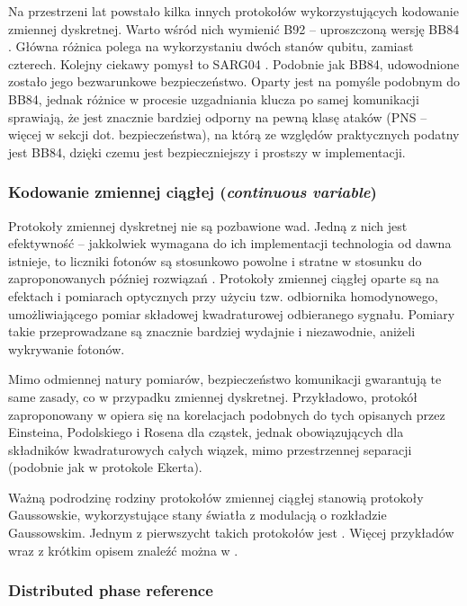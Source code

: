 \documentclass[10pt]{article}
\begin{document}
Na przestrzeni lat powstało kilka innych protokołów wykorzystujących kodowanie zmiennej dyskretnej.
Warto wśród nich wymienić B92 -- uproszczoną wersję BB84 \cite{Bennett92}. Główna różnica polega na
wykorzystaniu dwóch stanów qubitu, zamiast czterech. Kolejny ciekawy pomysł to SARG04 \cite{Scarani04}.
Podobnie jak BB84, udowodnione zostało jego bezwarunkowe bezpieczeństwo. Oparty jest na pomyśle 
podobnym do BB84, jednak różnice w procesie uzgadniania klucza po samej komunikacji sprawiają, że jest
znacznie bardziej odporny na pewną klasę ataków (PNS -- więcej w sekcji dot. bezpieczeństwa), na którą 
ze względów praktycznych podatny jest BB84, dzięki czemu jest bezpieczniejszy i prostszy w implementacji.


\subsubsection*{Kodowanie zmiennej ciągłej (\emph{continuous variable})}

Protokoły zmiennej dyskretnej nie są pozbawione wad. Jedną z nich jest efektywność -- jakkolwiek
wymagana do ich implementacji technologia od dawna istnieje, to liczniki fotonów są stosunkowo
powolne i stratne w stosunku do zaproponowanych później rozwiązań \cite{Reid00,Cerf01}. Protokoły
zmiennej ciągłej oparte są na efektach i pomiarach optycznych przy użyciu tzw. odbiornika homodynowego,
umożliwiającego pomiar składowej kwadraturowej odbieranego sygnału. Pomiary takie przeprowadzane
są znacznie bardziej wydajnie i niezawodnie, aniżeli wykrywanie fotonów.

Mimo odmiennej natury pomiarów, bezpieczeństwo komunikacji gwarantują te same zasady, co w przypadku
zmiennej dyskretnej. Przykładowo, protokół zaproponowany w \cite{Reid00} opiera się na korelacjach 
podobnych do tych opisanych przez Einsteina, Podolskiego i Rosena dla cząstek, jednak obowiązujących 
dla składników kwadraturowych całych wiązek, mimo przestrzennej separacji (podobnie jak w protokole 
Ekerta).

Ważną podrodzinę rodziny protokołów zmiennej ciągłej stanowią protokoły Gaussowskie, wykorzystujące
stany światła z modulacją o rozkładzie Gaussowskim. Jednym z pierwszycht takich protokołów jest 
\cite{Cerf01}. Więcej przykładów wraz z krótkim opisem znaleźć można w \cite{Scarani09}.


\subsubsection*{Distributed phase reference}
\end{document}
